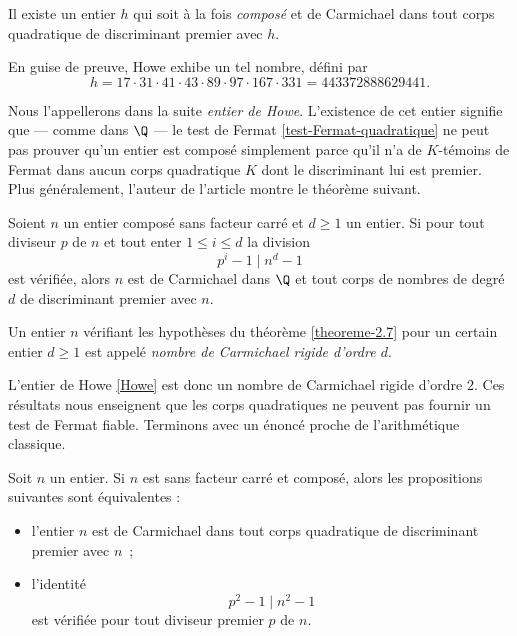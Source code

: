 \begin{theoreme}[Howe, 2000]
	Il existe un entier $h$ qui soit à la fois \emph{composé} et de Carmichael dans tout corps quadratique de discriminant premier avec $h$.
\end{theoreme}

En guise de preuve, Howe exhibe un tel nombre, défini par
	\begin{equation}\label{Howe}
		h = 17 \cdot 31 \cdot 41 \cdot 43 \cdot 89 \cdot 97 \cdot 167 \cdot 331 = 443372888629441.
	\end{equation}

Nous l'appellerons dans la suite \emph{entier de Howe}. L'existence de cet entier signifie que — comme dans $\Q$ — le test de Fermat \ref{test-Fermat-quadratique} ne peut pas prouver qu'un entier est composé simplement parce qu'il n'a de $K$-témoins de Fermat dans aucun corps quadratique $K$ dont le discriminant lui est premier. Plus généralement, l'auteur de l'article montre le théorème suivant.

\begin{theoreme}\label{theoreme-2.7}
	Soient $n$ un entier composé sans facteur carré et $d\geq 1$ un entier. Si pour tout diviseur $p$ de $n$ et tout enter $1\leq i \leq d$ la division $$p^i - 1\mid n^d - 1$$ est vérifiée, alors $n$ est de Carmichael dans $\Q$ et tout corps de nombres de degré $d$ de discriminant premier avec $n$.
\end{theoreme}

\begin{definition}
	Un entier $n$ vérifiant les hypothèses du théorème \ref{theoreme-2.7} pour un certain entier $d\geq 1$ est appelé \emph{nombre de Carmichael rigide d'ordre $d$}.
\end{definition}

L'entier de Howe \ref{Howe} est donc un nombre de Carmichael rigide d'ordre $2$. Ces résultats nous enseignent que les corps quadratiques ne peuvent pas fournir un test de Fermat fiable. Terminons avec un énoncé proche de l'arithmétique classique.

\begin{corollaire}
	Soit $n$ un entier. Si $n$ est sans facteur carré et composé, alors les propositions suivantes sont équivalentes :
	\begin{itemize}
		\item l'entier $n$ est de Carmichael dans tout corps quadratique de discriminant premier avec $n$~;
		\item l'identité \[p^2 - 1 \mid n^2 - 1\] est vérifiée pour tout diviseur premier $p$ de $n$.
	\end{itemize}
\end{corollaire}

